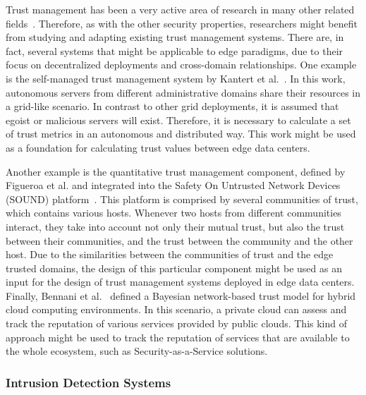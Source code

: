 \documentclass[twocolumn,preprint,3p]{elsarticle}
\begin{document}
Trust management has been a very active area of research in many other related fields~\cite{Shang12,Yan2014120,Corradini15}. Therefore, as with the other security properties, researchers might benefit from studying and adapting existing trust management systems. There are, in fact, several systems that might be applicable to edge paradigms, due to their focus on decentralized deployments and cross-domain relationships. One example is the self-managed trust management system by Kantert et al.~\cite{Kantert15}. In this work, autonomous servers from different administrative domains share their resources in a grid-like scenario. In contrast to other grid deployments, it is assumed that egoist or malicious servers will exist. Therefore, it is necessary to calculate a set of trust metrics in an autonomous and distributed way. This work might be used as a foundation for calculating trust values between edge data centers.

Another example is the quantitative trust management component, defined by Figueroa et al. and integrated into the Safety On Untrusted Network Devices (SOUND) platform~\cite{FigueroaUS15}. This platform is comprised by several communities of trust, which contains various hosts. Whenever two hosts from different communities interact, they take into account not only their mutual trust, but also the trust between their communities, and the trust between the community and the other host. Due to the similarities between the communities of trust and the edge trusted domains, the design of this particular component might be used as an input for the design of trust management systems deployed in edge data centers. Finally, Bennani et al.~\cite{Bennani14} defined a Bayesian network-based trust model for hybrid cloud computing environments. In this scenario, a private cloud can assess and track the reputation of various services provided by public clouds. This kind of approach might be used to track the reputation of services that are available to the whole ecosystem, such as Security-as-a-Service solutions.

\subsubsection{Intrusion Detection Systems}
\end{document}
